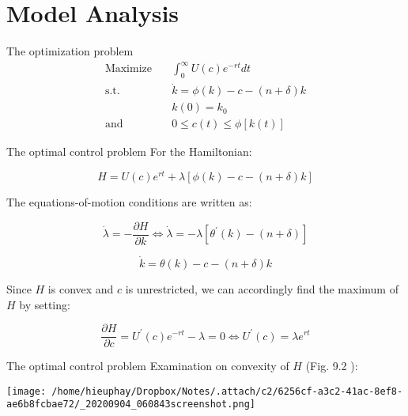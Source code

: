 \documentclass[10pt]{beamer}
\begin{document}
\section{Model Analysis}
\label{sec:org766ec81}
\begin{frame}[label={sec:org71983be}]{The optimization problem}
\begin{align*}
\text{Maximize} \quad & \int_0^{\infty} U(c)e^{-rt} dt \\
\text{s.t.} \quad     & \dot{k} = \phi(k) -c - (n + \delta)k \\
                  & k(0) = k_{0} \\
\text{and} \quad      & 0 \leq c(t) \leq \phi[k(t)]
\end{align*}
\end{frame}

\begin{frame}[label={sec:org2de348a}]{The optimal control problem}
For the Hamiltonian:

$$
H = U(c)e^{rt} + \lambda\left[\phi(k) - c - (n + \delta) k \right]
$$

The equations-of-motion conditions are written as:

\begin{equation}
  \dot{\lambda} = - \frac{\partial H}{\partial k} \Leftrightarrow \dot{\lambda} = -\lambda[\theta^{'}(k) - (n + \delta)]
\end{equation}

\begin{equation}
  \dot{k} = \theta(k) - c - (n + \delta) k
\end{equation}


Since \(H\) is convex and \(c\) is unrestricted, we can accordingly find the maximum of \(H\) by setting:

\begin{equation}
\frac{\partial H}{\partial c} = U^{\prime}(c) e^{-rt} - \lambda = 0 \Leftrightarrow U^{\prime}(c) = \lambda e^{rt}
\end{equation}
\end{frame}

\begin{frame}[label={sec:orgeb508ef}]{The optimal control problem}
Examination on convexity of \(H\) (Fig. 9.2 \cite{chiang2000elements}):

\begin{center}
\texttt{[image: /home/hieuphay/Dropbox/Notes/.attach/c2/6256cf-a3c2-41ac-8ef8-ae6b8fcbae72/\_20200904\_060843screenshot.png]}
\end{center}
\end{frame}
\end{document}
